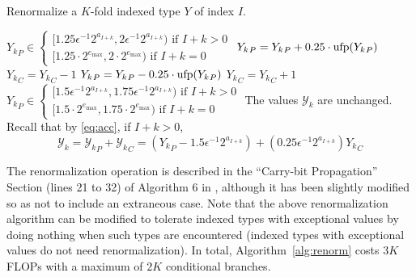     \begin{samepage}
    \begin{alg}
      Renormalize a $K$-fold indexed type $Y$ of index $I$.
      \begin{algorithmic}[1]
        \Require
        \Statex ${Y_k}_P \in \begin{cases}[1.25  \epsilon^{-1} 2^{a_{I + k}}, 2  \epsilon^{-1} 2^{a_{I + k}}) \text{ if } I + k > 0 \\ [1.25 \cdot 2^{e_{\max}}, 2 \cdot 2^{e_{\max}}) \text{ if } I + k = 0\end{cases} $
              \State ${Y_k}_P = {Y_k}_P + 0.25 \cdot \text{ufp}({Y_k}_P)$
              \State ${Y_k}_C = {Y_k}_C - 1$
            \EndIf
              \State ${Y_k}_P = {Y_k}_P - 0.25 \cdot \text{ufp}({Y_k}_P)$
              \State ${Y_k}_C = {Y_k}_C + 1$
            \EndIf
          \EndFor
        \EndFunction
        \Ensure
          \Statex ${Y_k}_P \in \begin{cases}[1.5  \epsilon^{-1} 2^{a_{I + k}}, 1.75  \epsilon^{-1} 2^{a_{I + k}}) \text{ if } I + k > 0 \\ [1.5 \cdot 2^{e_{\max}}, 1.75 \cdot 2^{e_{\max}}) \text{ if } I + k = 0\end{cases} $
          \Statex The values $\mathcal{Y}_k$ are unchanged. Recall that by \eqref{eq:acc}, if $I + k > 0$,
          \begin{equation*}
            \mathcal{Y}_k = {\mathcal{Y}_k}_P + {\mathcal{Y}_k}_C = ({Y_k}_P - 1.5 \epsilon^{-1} 2^{a_{I + k}}) + (0.25\epsilon^{-1}2^{a_{I + k}}){Y_k}_C
          \end{equation*}
      \end{algorithmic}
      \label{alg:renorm}
    \end{alg}
    \end{samepage}
    The renormalization operation is described in the ``Carry-bit Propagation''
    Section (lines 21 to 32) of Algorithm $6$ in \cite{repsum}, although it has
    been slightly modified so as not to include an extraneous case. Note that
    the above renormalization algorithm can be modified to tolerate
    indexed types with exceptional values by doing nothing when such types are
    encountered (indexed types with exceptional values do not need
    renormalization).
    In total, Algorithm~\ref{alg:renorm} costs $3K$ FLOPs with a maximum of
    $2K$ conditional branches.

